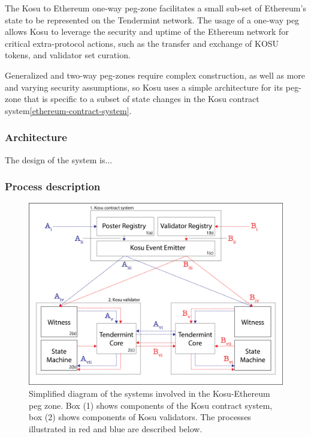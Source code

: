 \documentclass[10pt]{article}
\begin{document}
The Kosu to Ethereum one-way peg-zone facilitates a small sub-set of Ethereum's state to be represented on the Tendermint network. The usage of a one-way peg allows Kosu to leverage the security and uptime of the Ethereum network for critical extra-protocol actions, such as the transfer and exchange of KOSU tokens, and validator set curation.
\medskip

Generalized and two-way peg-zones require complex construction, as well as more and varying security assumptions, so Kosu uses a simple architecture for its peg-zone that is specific to a subset of state changes in the Kosu contract system\ref{ethereum-contract-system}.

\subsubsection{Architecture}\label{peg-architecture}
The design of the system is...

\subsubsection{Process description}\label{peg-process}
\begin{figure}[H]
  \centering
  \includegraphics[width=\textwidth]{../figures/fig1.png}
  \caption{Simplified diagram of the systems involved in the Kosu-Ethereum peg zone. Box (1) shows components of the Kosu contract system, box (2) shows components of Kosu validators. The processes illustrated in red and blue are described below.}
  \label{fig:fig2}
\end{figure}
\end{document}
